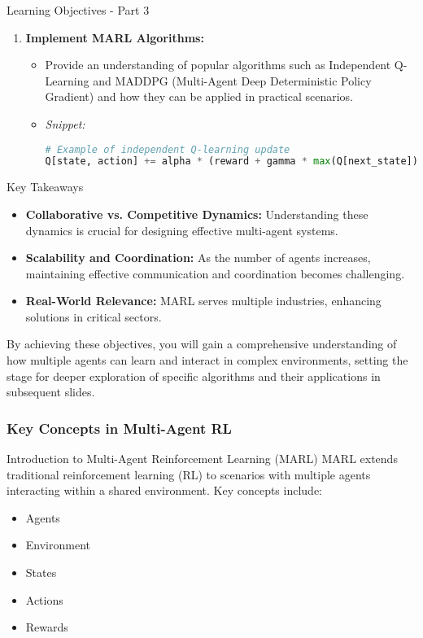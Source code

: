 \documentclass[aspectratio=169]{beamer}
\begin{document}
\begin{frame}[fragile]{Learning Objectives - Part 3}
    \begin{enumerate}[resume]
        \item \textbf{Implement MARL Algorithms:}
        \begin{itemize}
            \item Provide an understanding of popular algorithms such as Independent Q-Learning and MADDPG (Multi-Agent Deep Deterministic Policy Gradient) and how they can be applied in practical scenarios.
            \item \textit{Snippet:}
            \begin{lstlisting}[language=Python]
# Example of independent Q-learning update
Q[state, action] += alpha * (reward + gamma * max(Q[next_state]) - Q[state, action])
            \end{lstlisting}
        \end{itemize}
    \end{enumerate}
\end{frame}

\begin{frame}[fragile]{Key Takeaways}
    \begin{itemize}
        \item \textbf{Collaborative vs. Competitive Dynamics:} Understanding these dynamics is crucial for designing effective multi-agent systems.
        \item \textbf{Scalability and Coordination:} As the number of agents increases, maintaining effective communication and coordination becomes challenging.
        \item \textbf{Real-World Relevance:} MARL serves multiple industries, enhancing solutions in critical sectors.
    \end{itemize}

    By achieving these objectives, you will gain a comprehensive understanding of how multiple agents can learn and interact in complex environments, setting the stage for deeper exploration of specific algorithms and their applications in subsequent slides. 
\end{frame}

\begin{frame}[fragile]
    \frametitle{Key Concepts in Multi-Agent RL}
    \begin{block}{Introduction to Multi-Agent Reinforcement Learning (MARL)}
        MARL extends traditional reinforcement learning (RL) to scenarios with multiple agents interacting within a shared environment. Key concepts include:
    \end{block}
    
    \begin{itemize}
        \item Agents
        \item Environment
        \item States
        \item Actions
        \item Rewards
    \end{itemize}
\end{frame}
\end{document}
